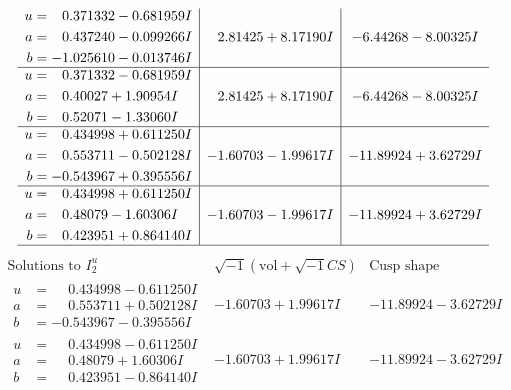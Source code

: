 \documentclass[1p]{elsarticle_modified}
\theoremstyle{definition}
\newcommand{\I}{\sqrt{-1}}
\begin{document}
$$\begin{array}{c|c|c}
\begin{aligned}
u &= \phantom{-}0.371332 - 0.681959 I \\
a &= \phantom{-}0.437240 - 0.099266 I \\
b &= -1.025610 - 0.013746 I\end{aligned}
 & \phantom{-}2.81425 + 8.17190 I & -6.44268 - 8.00325 I \\ \hline\begin{aligned}
u &= \phantom{-}0.371332 - 0.681959 I \\
a &= \phantom{-}0.40027 + 1.90954 I \\
b &= \phantom{-}0.52071 - 1.33060 I\end{aligned}
 & \phantom{-}2.81425 + 8.17190 I & -6.44268 - 8.00325 I \\ \hline\begin{aligned}
u &= \phantom{-}0.434998 + 0.611250 I \\
a &= \phantom{-}0.553711 - 0.502128 I \\
b &= -0.543967 + 0.395556 I\end{aligned}
 & -1.60703 - 1.99617 I & -11.89924 + 3.62729 I \\ \hline\begin{aligned}
u &= \phantom{-}0.434998 + 0.611250 I \\
a &= \phantom{-}0.48079 - 1.60306 I \\
b &= \phantom{-}0.423951 + 0.864140 I\end{aligned}
 & -1.60703 - 1.99617 I & -11.89924 + 3.62729 I\\
 \hline 
 \end{array}$$\newpage$$\begin{array}{c|c|c}  
\text{Solutions to }I^u_{2}& \I (\text{vol} + \sqrt{-1}CS) & \text{Cusp shape}\\
 \hline 
\begin{aligned}
u &= \phantom{-}0.434998 - 0.611250 I \\
a &= \phantom{-}0.553711 + 0.502128 I \\
b &= -0.543967 - 0.395556 I\end{aligned}
 & -1.60703 + 1.99617 I & -11.89924 - 3.62729 I \\ \hline\begin{aligned}
u &= \phantom{-}0.434998 - 0.611250 I \\
a &= \phantom{-}0.48079 + 1.60306 I \\
b &= \phantom{-}0.423951 - 0.864140 I\end{aligned}
 & -1.60703 + 1.99617 I & -11.89924 - 3.62729 I \\ \hline\begin{aligned}

\end{aligned}
\end{array}$$
\end{document}
